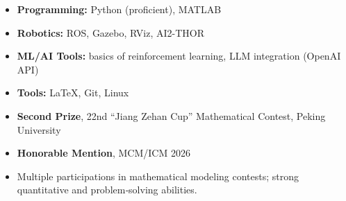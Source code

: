 




\nocite{*}
\vspace{-0.5em}
\begin{itemize}[parsep=0.5ex, leftmargin=1.5em]
  \item \textbf{Programming:} Python (proficient), MATLAB
  \item \textbf{Robotics:} ROS, Gazebo, RViz, AI2-THOR
  \item \textbf{ML/AI Tools:} basics of reinforcement learning, LLM integration (OpenAI API)
  \item \textbf{Tools:} LaTeX, Git, Linux
\end{itemize}



\begin{itemize}[parsep=0.7ex, leftmargin=1.5em]
  \item \textbf{Second Prize}, 22nd “Jiang Zehan Cup” Mathematical Contest, Peking University
  \item \textbf{Honorable Mention}, MCM/ICM 2026
  \item Multiple participations in mathematical modeling contests; strong quantitative and problem‑solving abilities.
\end{itemize}